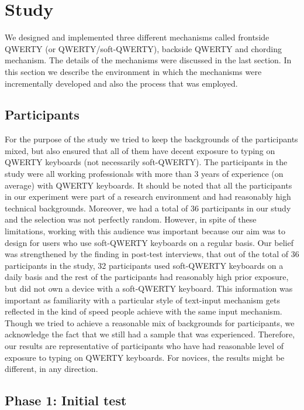 \section{Study}

We designed and implemented three different mechanisms called frontside QWERTY (or QWERTY/soft-QWERTY), backside QWERTY and chording mechanism. The details of the mechanisms were discussed in the last section. In this section we describe the environment in which the mechanisms were incrementally developed and also the process that was employed. 

\subsection{Participants}

For the purpose of the study we tried to keep the backgrounds of the participants mixed, but also ensured that all of them have decent exposure to typing on QWERTY keyboards (not necessarily soft-QWERTY). The participants in the study were all working professionals with more than 3 years of experience (on average) with QWERTY keyboards. It should be noted that all the participants in our experiment were part of a research environment and had reasonably high technical backgrounds. Moreover, we had a total of 36 participants in our study and the selection was not perfectly random. However, in spite of these limitations, working with this audience was important because our aim was to design for users who use soft-QWERTY keyboards on a regular basis. Our belief was strengthened by the finding in post-test interviews, that out of the total of 36 participants in the study, 32 participants used soft-QWERTY keyboards on a daily basis and the rest of the participants had reasonably high prior exposure, but did not own a device with a soft-QWERTY keyboard. This information was important as familiarity with a particular style of text-input mechanism gets reflected in the kind of speed people achieve with the same input mechanism. Though we tried to achieve a reasonable mix of backgrounds for participants, we acknowledge the fact that we still had a sample that was experienced. Therefore, our results are representative of participants who have had reasonable level of exposure to typing on QWERTY keyboards. For novices, the results might be different, in any direction.

\subsection{Phase 1: Initial test}

